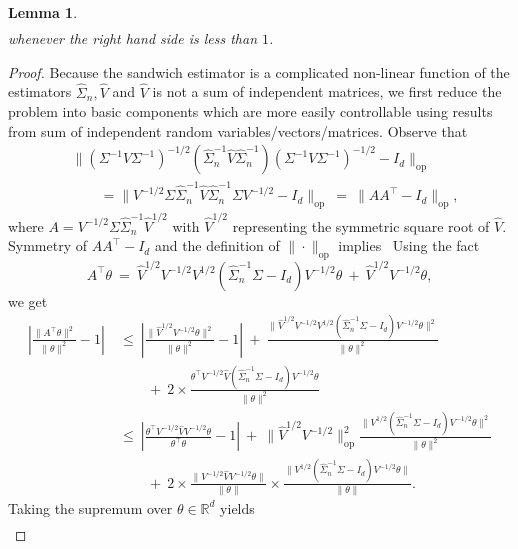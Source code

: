 \documentclass{article}
\newtheorem{lemma}{Lemma}
\begin{document}
\begin{appendices}
\begin{lemma}
\begin{align*}
\end{align*}
whenever the right hand side is less than $1$.
\end{lemma}
\begin{proof}
Because the sandwich estimator is a complicated non-linear function of the estimators $\widehat{\Sigma}_n, \widehat{V}$ and $\widehat{V}$ is not a sum of independent matrices, we first reduce the problem into basic components which are more easily controllable using results from sum of independent random variables/vectors/matrices.
Observe that
\begin{align*}
&\|(\Sigma^{-1}V\Sigma^{-1})^{-1/2}(\widehat{\Sigma}_n^{-1}\widehat{V}\widehat{\Sigma}_n^{-1})(\Sigma^{-1}V\Sigma^{-1})^{-1/2} - I_d\|_{\mathrm{op}}\\ &\qquad= \|V^{-1/2}\Sigma\widehat{\Sigma}_n^{-1}\widehat{V}\widehat{\Sigma}_n^{-1}\Sigma V^{-1/2} - I_d\|_{\mathrm{op}} ~=~ \|AA^{\top} - I_d\|_{\mathrm{op}},
\end{align*}
where $A = V^{-1/2}\Sigma\widehat{\Sigma}_n^{-1}\widehat{V}^{1/2}$ with $\widehat{V}^{1/2}$ representing the symmetric square root of $\widehat{V}$. Symmetry of $AA^{\top} - I_d$ and the definition of $\|\cdot\|_{\mathrm{op}}$ implies
\ Using the fact $$A^{\top}\theta ~=~ \widehat{V}^{1/2}V^{-1/2}V^{1/2}(\widehat{\Sigma}_n^{-1}\Sigma - I_d)V^{-1/2}\theta ~+~ \widehat{V}^{1/2}V^{-1/2}\theta,$$ we get
\begin{align*}
\left|\frac{\|A^{\top}\theta\|^2}{\|\theta\|^2} - 1\right| ~&\le~ \left|\frac{\|\widehat{V}^{1/2}V^{-1/2}\theta\|^2}{\|\theta\|^2} - 1\right| ~+~ \frac{\|\widehat{V}^{1/2}V^{-1/2}V^{1/2}(\widehat{\Sigma}_n^{-1}\Sigma - I_d)V^{-1/2}\theta\|^2}{\|\theta\|^2}\\ ~&\qquad+~ 2\times\frac{\theta^{\top}V^{-1/2}\widehat{V}(\widehat{\Sigma}_n^{-1}\Sigma - I_d)V^{-1/2}\theta}{\|\theta\|^2}\\ ~&\le~ \left|\frac{\theta^{\top}V^{-1/2}\widehat{V}V^{-1/2}\theta}{\theta^{\top}\theta} - 1\right| ~+~ \|\widehat{V}^{1/2}V^{-1/2}\|_{\mathrm{op}}^2\frac{\|V^{1/2}(\widehat{\Sigma}_n^{-1}\Sigma - I_d)V^{-1/2}\theta\|^2}{\|\theta\|^2}\\ ~&\qquad+~ 2\times\frac{\|V^{-1/2}\widehat{V}V^{-1/2}\theta\|}{\|\theta\|}\times\frac{\|V^{1/2}(\widehat{\Sigma}_n^{-1}\Sigma - I_d)V^{-1/2}\theta\|}{\|\theta\|}.
\end{align*}
Taking the supremum over $\theta\in\mathbb{R}^d$ yields
\begin{equation}\label{eq:main-inequality-sandwich}
\begin{split}

\end{split}
\end{equation}
\end{proof}
\end{appendices}
\end{document}
